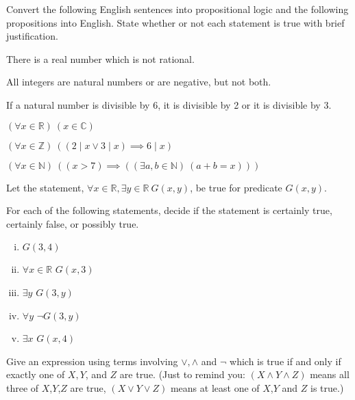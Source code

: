 Convert the following English sentences into propositional logic and the following propositions into English.  State whether or not each statement is true with brief justification.

\begin{Parts}

\Part There is a real number which is not rational.

\Part All integers are natural numbers or are negative, but not both.

\Part If a natural number is divisible by 6, it is divisible by 2 or it is divisible by 3.

\Part $(\forall x \in \mathbb{R})\ (x \in \mathbb{C})$

\Part $(\forall x \in \mathbb{Z})\ ((2 \mid x \lor 3 \mid x) \implies 6 \mid x)$

\Part $(\forall x \in \mathbb{N})\ ((x > 7) \implies ((\exists a, b \in \mathbb{N})\ (a + b = x)))$

\end{Parts}



\begin{Parts}

\Part
Let the statement, $\forall x \in \mathbb{R}, \exists y \in \mathbb{R} \  G(x,y)$, be
true for predicate $G(x,y)$. 

For each of the following statements, decide if the statement is certainly true, certainly false, or possibly true. 

\begin{enumerate}[(i)]

\item
$G(3,4)$

\item
$\forall x \in \mathbb{R}$ $G(x,3)$

\item
$\exists y$ $G(3,y)$

\item
$\forall y$ $\neg G(3,y)$

\item
$\exists x$ $G(x,4)$

\end{enumerate}

\Part
Give an expression using terms involving $\lor,\land$ and $\neg$ which is true if and only if
exactly one of $X,Y$, and $Z$ are true.  (Just to remind you: $(X \land Y \land Z)$ means
all three of $X$,$Y$,$Z$ are true, $(X \lor Y \lor Z)$ means at least one of $X$,$Y$
and $Z$ is true.)
    
\end{Parts}


